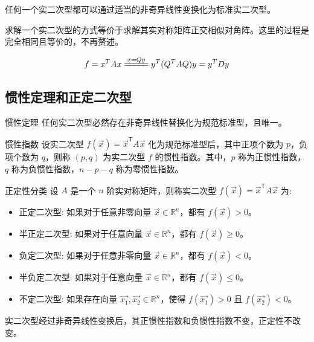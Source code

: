 \documentclass[a4paper,12pt]{ctexart}
\begin{document}
\begin{mythm}{}{}
    任何一个实二次型都可以通过适当的非奇异线性变换化为标准实二次型。
\end{mythm}

求解一个实二次型的方式等价于求解其实对称矩阵正交相似对角阵。这里的过程是完全相同且等价的，不再赘述。

\[
f = x^T A x \xlongequal{x=Qy} y^T (Q^T A Q) y = y^T D y
\]

\subsection{惯性定理和正定二次型}

\begin{mythm}{惯性定理}{}
    任何实二次型必然存在非奇异线性替换化为规范标准型，且唯一。
\end{mythm}

\begin{mydef}{惯性指数}{}
    设实二次型 $f(\vec{x}) = \vec{x}^{\mathsf{T}} A \vec{x}$ 化为规范标准型后，其中正项个数为 $p$，负项个数为 $q$，则称 $(p, q)$ 为实二次型 $f$ 的惯性指数。其中，$p$ 称为正惯性指数，$q$ 称为负惯性指数，$n - p - q$ 称为零惯性指数。
\end{mydef}

\begin{mydef}{正定性分类}{}
    设 $A$ 是一个 $n$ 阶实对称矩阵，则称实二次型 $f(\vec{x}) = \vec{x}^{\mathsf{T}} A \vec{x}$ 为:
    \begin{itemize}
        \item 正定二次型: 如果对于任意非零向量 $\vec{x} \in \mathbb{R}^n$，都有 $f(\vec{x}) > 0$。
        \item 半正定二次型: 如果对于任意向量 $\vec{x} \in \mathbb{R}^n$，都有 $f(\vec{x}) \geq 0$。
        \item 负定二次型: 如果对于任意非零向量 $\vec{x} \in \mathbb{R}^n$，都有 $f(\vec{x}) < 0$。
        \item 半负定二次型: 如果对于任意向量 $\vec{x} \in \mathbb{R}^n$，都有 $f(\vec{x}) \leq 0$。
        \item 不定二次型: 如果存在向量 $\vec{x_1}, \vec{x_2} \in \mathbb{R}^n$，使得 $f(\vec{x_1}) > 0$ 且 $f(\vec{x_2}) < 0$。
    \end{itemize}
\end{mydef}

\begin{mythm}{}{}
    实二次型经过非奇异线性变换后，其正惯性指数和负惯性指数不变，正定性不改变。
\end{mythm}
\end{document}
